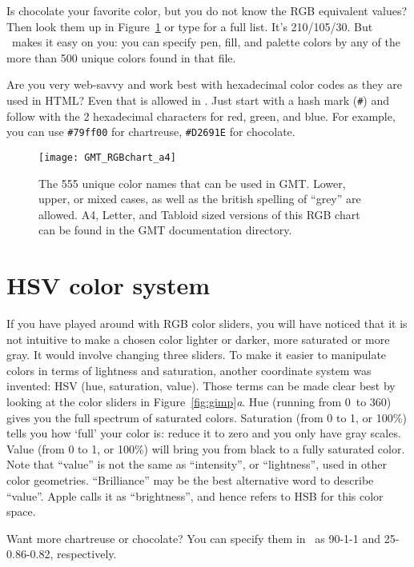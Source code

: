 Is chocolate your favorite color, but you do not know the RGB equivalent values? Then look them up in Figure~\ref{fig:RGBchart} or type  for a full list. It's 210/105/30. But \GMT\ makes it easy on you: you can specify pen, fill, and palette colors by any of the more than 500 unique colors found in that file.

Are you very web-savvy and work best with hexadecimal color codes as they are used in HTML? Even that is allowed in \GMT. Just start with a hash mark (\texttt{\#}) and follow with the 2 hexadecimal characters for red, green, and blue. For example, you can use \texttt{\#79ff00} for chartreuse, \texttt{\#D2691E} for chocolate.

\begin{figure}
   \texttt{[image: GMT\_RGBchart\_a4]}
   \caption{The 555 unique color names that can be used in GMT. Lower, upper, or mixed cases, as well as the british
   spelling of ``grey'' are allowed. A4, Letter, and Tabloid sized versions of this RGB chart can be found in the
   GMT documentation directory.}
   \label{fig:RGBchart}
\end{figure}

\section{HSV color system}
If you have played around with RGB color sliders, you will have noticed that it is not intuitive to make a chosen color lighter or darker, more saturated or more gray. It would involve changing three sliders. To make it easier to manipulate colors in terms of lightness and saturation, another coordinate system was invented: HSV (hue, saturation, value). Those terms can be made clear best by looking at the color sliders in Figure~\ref{fig:gimp}\emph{a}. Hue (running from 0\DS\ to 360\DS) gives you the full spectrum of saturated colors. Saturation (from 0 to 1, or 100\%) tells you how `full' your color is: reduce it to zero and you only have gray scales. Value (from 0 to 1, or 100\%) will bring you from black to a fully saturated color. Note that ``value'' is not the same as ``intensity'', or ``lightness'', used in other color geometries. ``Brilliance'' may be the best alternative word to describe ``value''. Apple calls it as ``brightness'', and hence refers to HSB for this color space.

Want more chartreuse or chocolate? You can specify them in \GMT\ as 90-1-1 and 25-0.86-0.82, respectively.

